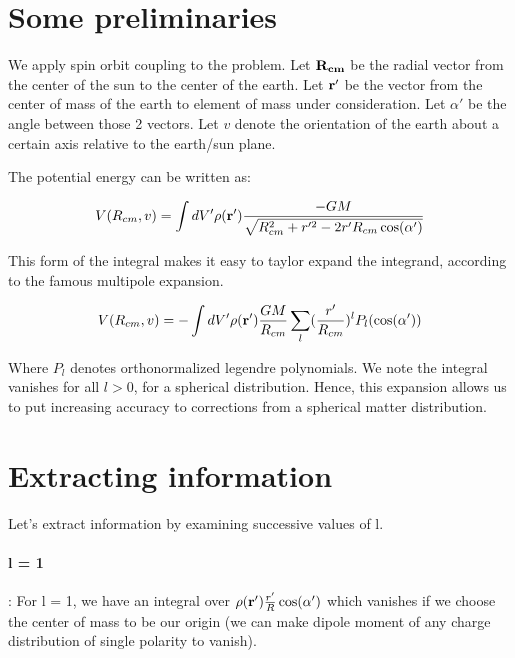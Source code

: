 \documentclass[12pt]{article}
\begin{document}
\maketitle

\section{Some preliminaries}

We apply spin orbit coupling to the problem.  Let ${\bf R_{cm}}$ be the radial vector from the center of the sun to the center of the earth. Let ${\bf r'}$ be the vector from the center of mass of the earth to element of mass under consideration.  Let $\alpha '$ be the angle between those 2 vectors.  Let $v$ denote the orientation of the earth about a certain axis relative to the earth/sun plane.

\noindent The potential energy can be written as:

\begin{equation}
    V(R_{cm}, v) = \int dV' \rho({\bf r'}) \frac{-GM}{\sqrt{R_{cm}^2 + r'^2 - 2r'R_{cm} \cos(\alpha')}}
\end{equation}

This form of the integral makes it easy to taylor expand the integrand, according to the famous multipole expansion.

\begin{equation}
    V(R_{cm}, v) =- \int dV' \rho({\bf r'}) \frac{GM}{R_{cm}} \sum_l (\frac{r'}{R_{cm}})^l P_l (\cos(\alpha'))
\end{equation}

Where $P_l$ denotes orthonormalized legendre polynomials. We note the integral vanishes for all $l>0$, for a spherical distribution.  Hence, this expansion allows us to put increasing accuracy to corrections from a spherical matter distribution.

\section{Extracting information}

Let's extract information by examining successive values of l.

\paragraph{l = 1}: For l = 1, we have an integral over $\rho({\bf r'})\frac{r'}{R} \cos(\alpha')$ which vanishes if we choose the center of mass to be our origin (we can make dipole moment of any charge distribution of single polarity to vanish).
\end{document}
